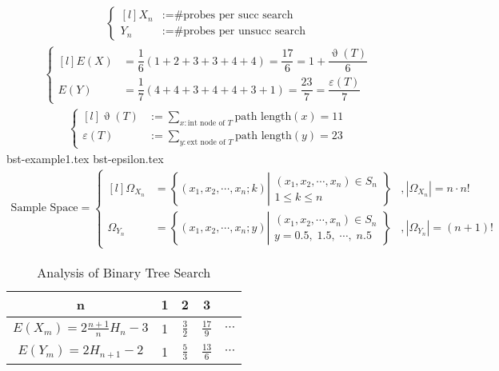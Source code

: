 \documentclass[12pt,a4paper,oneside]{report}
\begin{document}
\begin{align*}
	\left\{\begin{matrix*}[l]
		X_n &:= \text{\# probes per succ search} \\
		Y_n &:= \text{\# probes per unsucc search}
	\end{matrix*}\right.
\end{align*}
\begin{align*}
	\left\{\begin{matrix*}[l]
		E(X) &= \dfrac{1}{6} \left(1+2+3+3+4+4\right) = \dfrac{17}{6} = 1 + \dfrac{\upvartheta(T)}{6} \\
		E(Y) &= \dfrac{1}{7} \left(4+4+3+4+4+3+1\right) = \dfrac{23}{7} = \dfrac{\varepsilon(T)}{7}
	\end{matrix*}\right.
\end{align*}
\begin{align*}
	\left\{\begin{matrix*}[l]
		\upvartheta(T) &:= \sum_{x : \text{int node of } T} \text{path length}(x) = 11\\
		\varepsilon(T) &:= \sum_{y : \text{ext node of } T} \text{path length}(y) = 23
	\end{matrix*}\right.
\end{align*}
{bst-example1.tex}
{bst-epsilon.tex}
\begin{align*}
	\text{Sample Space} = \left\{\begin{matrix*}[l]
		\Omega_{X_n} &= \left\{(x_1, x_2, \cdots, x_n; k) 
			\left|\begin{matrix}
				(x_1, x_2, \cdots, x_n) \in S_n \\ 
				1 \le k \le n
			\end{matrix}\right. 
		\right\} &, |\Omega_{X_n}| = n \cdot n! \\
		\Omega_{Y_n} &= \left\{(x_1, x_2, \cdots, x_n; y)
	   		\left|\begin{matrix}	
				(x_1, x_2, \cdots, x_n) \in S_n \\
				y = 0.5, \; 1.5, \; \cdots, \; n.5
			\end{matrix}\right.
		\right\} &, |\Omega_{Y_n}| = (n+1)!
	\end{matrix*}\right. 
\end{align*}

\begin{table}[]
	\centering
	\caption{Analysis of Binary Tree Search}
	\label{bst}
	\begin{tabular}{|c | c | c | c | c|}
		\hline
		n & 1 & 2 & 3 &
		\\ \hline
		$E(X_m) = 2 \frac{n+1}{n} H_n - 3$ & 1 & $\frac{3}{2}$ & $\frac{17}{9}$ & $\cdots$ 
		\\ \hline
		$E(Y_m) = 2 H_{n+1} - 2$ & 1 & $\frac{5}{3}$ & $\frac{13}{6}$ & $\cdots$ 
		\\ \hline
	\end{tabular}
\end{table}
\end{document}

